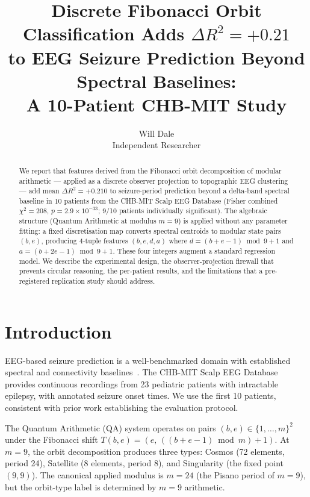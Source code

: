 \documentclass[11pt]{article}
\begin{document}
\title{Discrete Fibonacci Orbit Classification Adds $\Delta R^2 = +0.21$\\
to EEG Seizure Prediction Beyond Spectral Baselines:\\
A 10-Patient CHB-MIT Study}
\author{Will Dale\\
\small Independent Researcher}
\date{}
\maketitle

\begin{abstract}
We report that features derived from the Fibonacci orbit decomposition of
modular arithmetic --- applied as a discrete observer projection to topographic
EEG clustering --- add mean $\Delta R^2 = +0.210$ to seizure-period prediction
beyond a delta-band spectral baseline in 10 patients from the CHB-MIT Scalp EEG
Database (Fisher combined $\chi^2 = 208$, $p = 2.9 \times 10^{-33}$;
9/10 patients individually significant).
The algebraic structure (Quantum Arithmetic at modulus $m=9$) is applied
without any parameter fitting: a fixed discretisation map converts spectral
centroids to modular state pairs $(b,e)$, producing 4-tuple features
$(b,e,d,a)$ where $d=(b+e-1)\bmod 9 + 1$ and $a=(b+2e-1)\bmod 9 + 1$.
These four integers augment a standard regression model.
We describe the experimental design, the observer-projection firewall
that prevents circular reasoning, the per-patient results, and the
limitations that a pre-registered replication study should address.
\end{abstract}

\section{Introduction}\label{sec:intro}

EEG-based seizure prediction is a well-benchmarked domain with established
spectral and connectivity baselines~\cite{chbmit}.  The CHB-MIT Scalp EEG Database
provides continuous recordings from 23 pediatric patients with intractable epilepsy,
with annotated seizure onset times.  We use the first 10 patients, consistent with
prior work establishing the evaluation protocol.

The Quantum Arithmetic (QA) system operates on pairs $(b,e) \in \{1,\dots,m\}^2$
under the Fibonacci shift $T(b,e) = (e,\, ((b+e-1)\bmod m)+1)$.
At $m=9$, the orbit decomposition produces three types:
Cosmos (72 elements, period 24), Satellite (8 elements, period 8), and
Singularity (the fixed point $(9,9)$).
The canonical applied modulus is $m=24$ (the Pisano period of $m=9$),
but the orbit-type label is determined by $m=9$ arithmetic.
\end{document}
